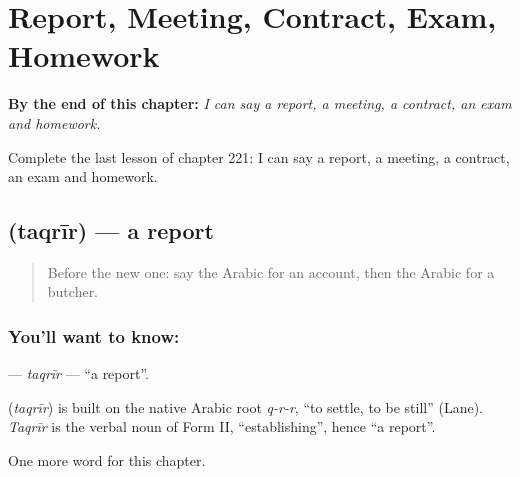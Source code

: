 
\chapter{Report, Meeting, Contract, Exam, Homework}
\label{ch:ar-report-meeting-contract-exam-homework}

\begin{chapteropening}
\textbf{By the end of this chapter:} \emph{I can say a report, a meeting, a contract, an exam and homework.}

Complete the last lesson of chapter 221: I can say a report, a meeting, a contract, an exam and homework.
\end{chapteropening}

\section[\texorpdfstring{\ar{تقرير} (taqrīr)}{تقرير (taqrīr)}]{ (taqrīr) — a report}

\label{lesson:AR-C221-taqrir}



\begin{quote}
Before the new one: say the Arabic for an account, then the Arabic for a butcher.
\end{quote}

\subsection*{You'll want to know: }
\textbf{} — \emph{taqrīr} — \textquotedblleft{}a report\textquotedblright{}.

\begin{cousinweb}
\textbf{} (\emph{taqrīr}) is built on the native Arabic root \emph{q-r-r}, \textquotedblleft{}to settle, to be still\textquotedblright{} (Lane). \emph{Taqrīr} is the verbal noun of Form II, \textquotedblleft{}establishing\textquotedblright{}, hence \textquotedblleft{}a report\textquotedblright{}.
\end{cousinweb}

\begin{grammarlens}[title={What you've built}]
One more word for this chapter.
\end{grammarlens}

